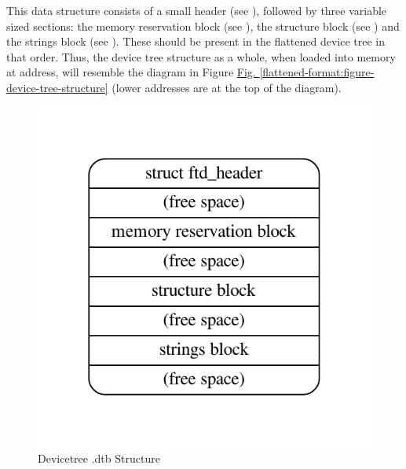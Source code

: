 \documentclass[a4paper,10pt,oneside]{sphinxmanual}
\begin{document}
This data structure consists of a small header (see
{\hyperref[flattened\string-format:sect\string-fdt\string-header]{}}), followed by three variable sized sections: the
memory reservation block (see {\hyperref[flattened\string-format:sect\string-fdt\string-memory\string-reservation\string-block]{}}),
the structure block (see {\hyperref[flattened\string-format:sect\string-fdt\string-structure\string-block]{}}) and the
strings block (see {\hyperref[flattened\string-format:sect\string-fdt\string-strings\string-block]{}}). These should be
present in the flattened device tree in that order. Thus, the device
tree structure as a whole, when loaded into memory at address, will
resemble the diagram in Figure \hyperref[flattened-format:figure-device-tree-structure]{Fig. \ref{flattened-format:figure-device-tree-structure}}
(lower addresses are at the top of the diagram).
\begin{figure}[htbp]
\centering
\capstart

\includegraphics{graphviz-23a197b43ca822bb92fb1a341bdd04b0845caa29.pdf}
\caption{Devicetree .dtb Structure}\label{flattened-format:figure-device-tree-structure}\label{flattened-format:id1}\end{figure}
\end{document}
